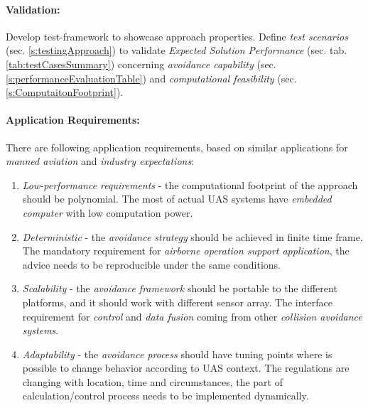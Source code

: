 \paragraph{Validation:} Develop test-framework to showcase approach properties. Define \emph{test scenarios} (sec. \ref{s:testingApproach}) to validate \emph{Expected Solution Performance} (sec.  tab. \ref{tab:testCasesSummary}) concerning \emph{avoidance capability} (sec. \ref{s:performanceEvaluationTable}) and \emph{computational feasibility} (sec. \ref{s:ComputaitonFootprint}).

\paragraph{Application Requirements:} There are  following application requirements, based on similar applications for \emph{manned aviation} and \emph{industry expectations}:

\begin{enumerate}
    \item \emph{Low-performance requirements} - the computational footprint of the approach should be polynomial. The most of actual UAS systems have \emph{embedded computer} with low computation power.
    
    \item \emph{Deterministic} - the \emph{avoidance strategy} should be achieved in finite time frame. The mandatory requirement for \emph{airborne operation support application}, the advice needs to be reproducible under the same conditions.
    
    \item \emph{Scalability} - the \emph{avoidance framework} should be portable to the different platforms, and it should work with different sensor array. The interface requirement for \emph{control} and \emph{data fusion} coming from other \emph{collision avoidance systems}.
    
    \item \emph{Adaptability} - the \emph{avoidance process} should have tuning points where is possible to change behavior according to UAS context. The regulations are changing with location, time and circumstances, the part of calculation/control process needs to be implemented dynamically.
\end{enumerate}
